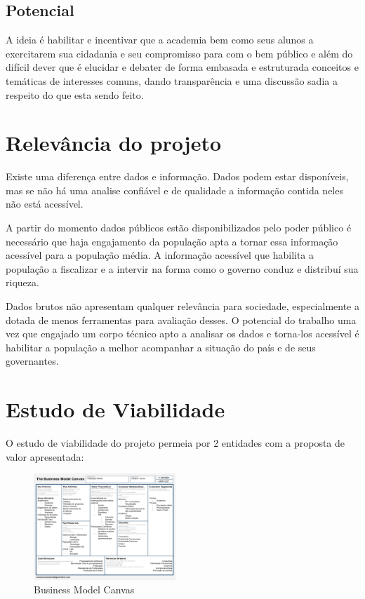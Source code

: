 \documentclass[journal]{IEEEtran}
\begin{document}
\subsection{Potencial}
A ideia é habilitar e incentivar que a academia bem como seus alunos a exercitarem sua cidadania e seu compromisso para com o bem público e além do difícil dever que é elucidar e debater de forma embasada e estruturada conceitos e temáticas de interesses comuns, dando transparência e uma discussão sadia a respeito do que esta sendo feito.

\section{Relevância do projeto}
Existe uma diferença entre dados e informação. Dados podem estar disponíveis, mas se não há uma analise confiável e de qualidade a informação contida neles não está acessível.

A partir do momento dados públicos estão disponibilizados pelo poder público é necessário que haja engajamento da população apta a tornar essa informação acessível para a população média. A informação acessível que habilita a população a fiscalizar e a intervir na forma como o governo conduz e distribuí sua riqueza.

Dados brutos não apresentam qualquer relevância para sociedade, especialmente a dotada de menos ferramentas para avaliação desses. O potencial do trabalho uma vez que engajado um corpo técnico apto a analisar os dados e torna-los acessível é habilitar a população a melhor acompanhar a situação do país e de seus governantes.

\section{Estudo de Viabilidade}

O estudo de viabilidade do projeto permeia por 2 entidades com a proposta de valor apresentada:
\begin{figure}[htpb]
    \centering
    \includegraphics[height=4cm,keepaspectratio=true]{docs/BM.png}
    \caption{Business Model Canvas}
    \label{fig:BM}
    \centering
\end{figure}
\end{document}
